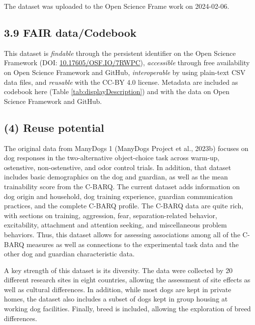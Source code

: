 \documentclass[
  pub,floatsintext]{apa6}
\begin{document}
The dataset was uploaded to the Open Science Frame work on 2024-02-06.

\hypertarget{fair-datacodebook}{%
\subsection{3.9 FAIR data/Codebook}\label{fair-datacodebook}}

This dataset is \emph{findable} through the persistent identifier on the Open Science Framework (DOI: \href{https://doi.org/10.17605/OSF.IO/7RWPC}{10.17605/OSF.IO/7RWPC}), \emph{accessible} through free availability on Open Science Framework and GitHub, \emph{interoperable} by using plain-text CSV data files, and \emph{reusable} with the CC-BY 4.0 license. Metadata are included as codebook here (Table \ref{tab:displayDescription}) and with the data on Open Science Framework and GitHub.

\hypertarget{reuse-potential}{%
\subsection{(4) Reuse potential}\label{reuse-potential}}

The original data from ManyDogs 1 (ManyDogs Project et al., 2023b) focuses on dog responses in the two-alternative object-choice task across warm-up, ostenstive, non-ostenstive, and odor control trials. In addition, that dataset includes basic demographics on the dog and guardian, as well as the mean trainability score from the C-BARQ. The current dataset adds information on dog origin and household, dog training experience, guardian communication practices, and the complete C-BARQ profile. The C-BARQ data are quite rich, with sections on training, aggression, fear, separation-related behavior, excitability, attachment and attention seeking, and miscellaneous problem behaviors. Thus, this dataset allows for assessing associations among all of the C-BARQ measures as well as connections to the experimental task data and the other dog and guardian characteristic data.

A key strength of this dataset is its diversity. The data were collected by 20 different research sites in eight countries, allowing the assessment of site effects as well as cultural differences. In addition, while most dogs are kept in private homes, the dataset also includes a subset of dogs kept in group housing at working dog facilities. Finally, breed is included, allowing the exploration of breed differences.
\end{document}

